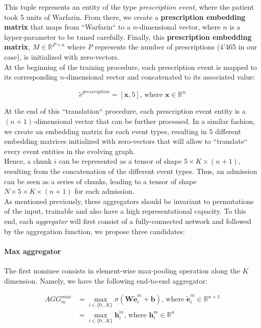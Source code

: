 This tuple represents an entity of the type \emph{prescription event}, where the patient took 5 units of Warfarin. From there, we create a \textbf{prescription embedding matrix} that maps from ``Warfarin`` to a $n$-dimensional vector, where $n$ is a hyper-parameter to be tuned carefully. Finally, this \textbf{prescription embedding matrix}, $M\in\mathbb{R}^{P \times n}$ where $P$ represents the number of prescriptions (4'465 in our case), is initialized with zero-vectors. \\

At the beginning of the training procedure, each prescription event is mapped to its corresponding $n$-dimensional vector and concatenated to its associated value:

\begin{equation*}
\tilde{e}^{prescription} = [\bm{x}, 5]\mbox{, where }\bm{x}\in\mathbb{R}^n
\end{equation*}

At the end of this ``translation`` procedure, each prescription event entity is a $(n+1)$-dimensional vector that can be further processed. In a similar fashion, we create an embedding matrix for each event types, resulting in 5 different embedding matrices initialized with zero-vectors that will allow to ``translate`` every event entities in the evolving graph. \\

Hence, a chunk $i$ can be represented as a tensor of shape $5 \times K \times (n+1)$, resulting from the concatenation of the different event types. Thus, an admission can be seen as a series of chunks, leading to a tensor of shape $N \times 5 \times K \times (n+1)$ for each admission. \\

As mentioned previously, these aggregators should be invariant to permutations of the input, trainable and also have a high representational capacity. To this end, each \textit{aggregator} will first consist of a fully-connected network and followed by the aggregation function, we propose three candidates:

\paragraph{Max aggregator} The first nominee consists in element-wise max-pooling operation along the $K$ dimension. Namely, we have the following end-to-end aggregator:

\begin{equation}
 \label{eq:max_agg}
 \begin{aligned}
 AGG_m^{max} &= \max_{i \in \{0 \dots K\}} \sigma(\bm{W}\bm{\tilde{e}}_i^m + \bm{b})\mbox{, where }\bm{\tilde{e}}_i^m \in \mathbb{R}^{n+1} \\
 &= \max_{i \in \{0 \dots K\}} \bm{h}_i^m\mbox{, where }\bm{h}_i^m \in \mathbb{R}^{a}
 \end{aligned}
\end{equation}

